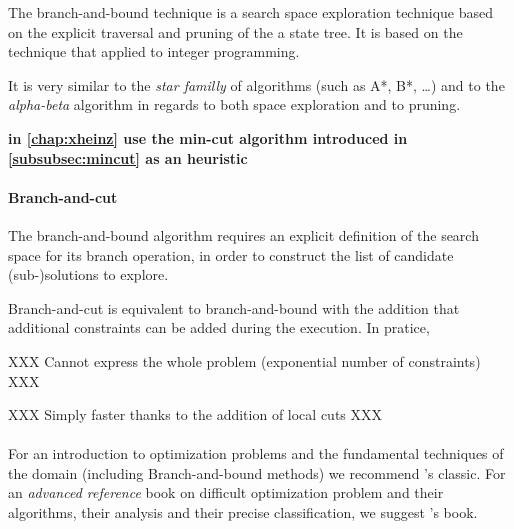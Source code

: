				The branch-and-bound technique is a search space exploration technique based on the explicit traversal and pruning of the a state tree.
				It is based on the technique that \textcite{land1960automatic} applied to integer programming.

				It is very similar to the \emph{star familly} of algorithms (such as A*, B*, \dots{}) and to the \emph{alpha-beta} algorithm in regards to both space exploration and to pruning.

				\textbf{in \cref{chap:xheinz} use the min-cut algorithm introduced in \cref{subsubsec:mincut} as an heuristic}

			\paragraph{Branch-and-cut}

				The branch-and-bound algorithm requires an explicit definition of the search space for its branch operation, in order to construct the list of candidate (sub-)solutions to explore.

				Branch-and-cut is equivalent to branch-and-bound with the addition that additional constraints can be added during the execution.
				In pratice, 
				
				XXX Cannot express the whole problem (exponential number of constraints) XXX

				XXX Simply faster thanks to the addition of local cuts XXX

		\paragraph{}
		\paragraph{}
		For an introduction to optimization problems and the fundamental techniques of the domain (including Branch-and-bound methods) we recommend \textcite{papadimitriou1982combinatorial}'s classic.
		For an \emph{advanced reference} book on difficult optimization problem and their algorithms, their analysis and their precise classification, we suggest \textcite{hromkovivc2013algorithmics}'s book.
